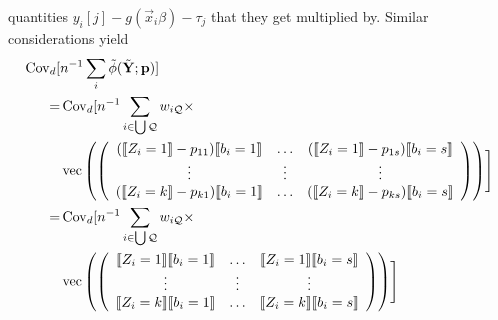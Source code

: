 \documentclass{article}
\DeclarePairedDelimiter{\indicator}{\llbracket}{\rrbracket}
\begin{document}
quantities
$y_{i}[j] - g(\vec{x}_{i}\beta) - \tau_{j}$ that they get
multiplied by.  Similar considerations yield
\begin{align}
\operatorname{Cov}_{d}[
  &n^{-1}\sum_{i}\tilde{\phi}(\tilde{\mathbf{Y}}; \mathbf{p})] \nonumber\\
  =&\operatorname{Cov}_{d}[n^{-1}
                                                 \sum_{i \in \bigcup
     \mathcal{Q}} w_{i\mathcal{Q}} \times \nonumber \\
&  \operatorname{vec}\left(%
                                                 \left(
                                                 \begin{array}{ccc}
                                                   (\indicator{Z_{i}=1}-p_{11})\indicator{b_{i}=1}&\ldots&(\indicator{Z_{i}=1}-p_{1s})\indicator{b_{i}=s}\\
                                                   \vdots & \vdots &
                                                                     \vdots
                                                   \\
                                                   (\indicator{Z_{i}=k}-p_{k1})\indicator{b_{i}=1}&\ldots&(\indicator{Z_{i}=k}-p_{ks})\indicator{b_{i}=s}\\                                                   
                                                 \end{array}
  \right)%
  \right)
  \Biggr] \nonumber \\ 
  =&\operatorname{Cov}_{d}[n^{-1}
                                                 \sum_{i \in \bigcup
     \mathcal{Q}} w_{i\mathcal{Q}} \times \nonumber \\
  &\operatorname{vec}\left(%
                                                 \left(
                                                 \begin{array}{ccc}
                                                   \indicator{Z_{i}=1}\indicator{b_{i}=1}&\ldots&\indicator{Z_{i}=1}\indicator{b_{i}=s}\\
                                                   \vdots & \vdots &
                                                                     \vdots
                                                   \\
                                                   \indicator{Z_{i}=k}\indicator{b_{i}=1}&\ldots&\indicator{Z_{i}=k}\indicator{b_{i}=s}\\                                                   
                                                 \end{array}  
  \right)%
  \right)
    \Biggr] \label{eq:11}
\end{align}
\end{document}
